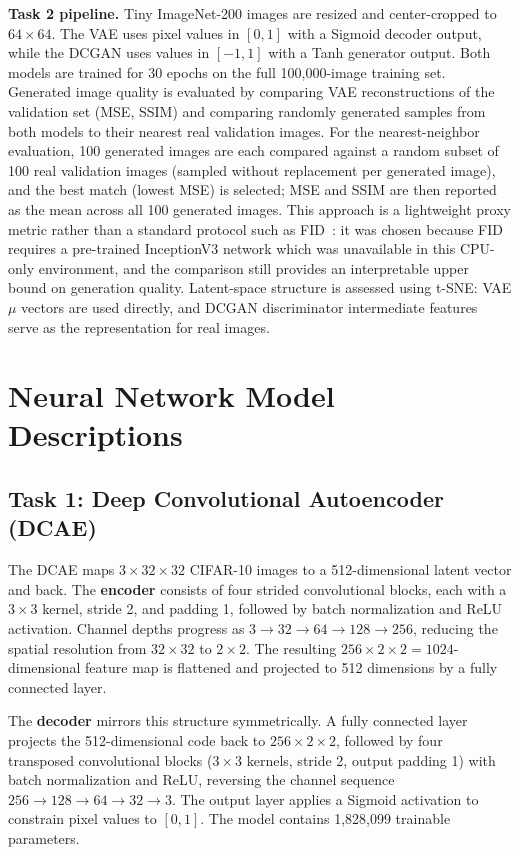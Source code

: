 \documentclass[12pt]{article}
\begin{document}
\textbf{Task 2 pipeline.} Tiny ImageNet-200 images are resized and center-cropped to $64\times64$. The VAE uses pixel values in $[0, 1]$ with a Sigmoid decoder output, while the DCGAN uses values in $[-1, 1]$ with a Tanh generator output. Both models are trained for 30 epochs on the full 100,000-image training set. Generated image quality is evaluated by comparing VAE reconstructions of the validation set (MSE, SSIM) and comparing randomly generated samples from both models to their nearest real validation images. For the nearest-neighbor evaluation, 100 generated images are each compared against a random subset of 100 real validation images (sampled without replacement per generated image), and the best match (lowest MSE) is selected; MSE and SSIM are then reported as the mean across all 100 generated images. This approach is a lightweight proxy metric rather than a standard protocol such as FID~\cite{fid2017}: it was chosen because FID requires a pre-trained InceptionV3 network which was unavailable in this CPU-only environment, and the comparison still provides an interpretable upper bound on generation quality. Latent-space structure is assessed using t-SNE: VAE $\mu$ vectors are used directly, and DCGAN discriminator intermediate features serve as the representation for real images.

\section{Neural Network Model Descriptions}

\subsection{Task 1: Deep Convolutional Autoencoder (DCAE)}

The DCAE maps $3\times32\times32$ CIFAR-10 images to a 512-dimensional latent vector and back. The \textbf{encoder} consists of four strided convolutional blocks, each with a $3\times3$ kernel, stride 2, and padding 1, followed by batch normalization and ReLU activation. Channel depths progress as $3\to32\to64\to128\to256$, reducing the spatial resolution from $32\times32$ to $2\times2$. The resulting $256\times2\times2 = 1024$-dimensional feature map is flattened and projected to 512 dimensions by a fully connected layer.

The \textbf{decoder} mirrors this structure symmetrically. A fully connected layer projects the 512-dimensional code back to $256\times2\times2$, followed by four transposed convolutional blocks ($3\times3$ kernels, stride 2, output padding 1) with batch normalization and ReLU, reversing the channel sequence $256\to128\to64\to32\to3$. The output layer applies a Sigmoid activation to constrain pixel values to $[0, 1]$. The model contains 1,828,099 trainable parameters.
\end{document}
